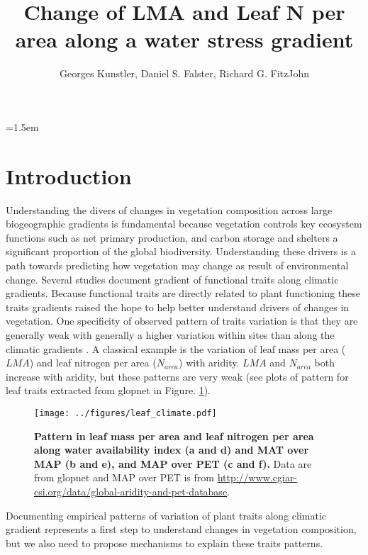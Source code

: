 \documentclass[a4paper,11pt]{article}
\title{Change of LMA and Leaf N per area along a water stress gradient}
\author{Georges Kunstler, Daniel S. Falster, Richard G. FitzJohn}
\date{}
\affiliation{INRAE, Grenoble, France and Department of Biological Sciences, Macquarie University,
  Sydney, Australia}
\date{}
\begin{document}
\mstitleshort
\parindent=1.5em
\addtolength{\parskip}{.3em}


\section{Introduction}

Understanding the divers of changes in vegetation composition across large biogeographic gradients is fundamental because vegetation controls key ecosystem functions such as net primary production, and carbon storage and shelters a significant proportion of the global biodiversity. Understanding these drivers is a path towards predicting how vegetation may change as result of environmental change. Several studies document gradient of functional traits along climatic
gradients. Because functional traits are directly related to plant functioning these traits gradients raised the hope to help better understand drivers of changes in vegetation. One specificity of observed pattern of traits variation is
that they are generally weak with generally a higher variation within
sites than along the climatic gradients \citep[see][]{Wright-2004}. A
classical example is the variation of leaf mass per area ($LMA$) and
leaf nitrogen per area ($N_{area}$) with aridity. $LMA$
\citep{Wright-2004,Onoda-2011,Moles-2014} and $N_{area}$
\citep{Wright-2005,Maire-2015} both increase with aridity, but these
patterns are very weak (see plots of pattern for leaf traits extracted from glopnet \citep{Wright-2004} in Figure. \ref{fig:leafpattern}).

\begin{figure}[ht]
\centering
\texttt{[image: ../figures/leaf\_climate.pdf]}
\caption{\textbf{Pattern in leaf mass per area and leaf nitrogen per area along water availability index (a and d) and MAT over MAP (b and e), and MAP over PET (c and f).} Data are from glopnet \citep{Wright-2004} and MAP over PET is from \url{http://www.cgiar-csi.org/data/global-aridity-and-pet-database}.
\label{fig:leafpattern}}
\end{figure}

Documenting empirical patterns of variation of plant traits along
climatic gradient represents a first step to understand changes in
vegetation composition, but we also need to propose mechanisms to
explain these traits patterns. 
\end{document}
